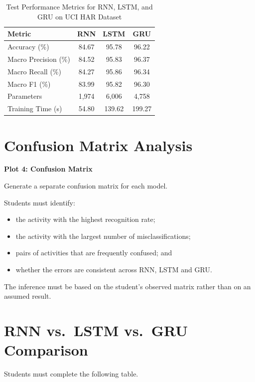 \documentclass[10pt]{article}
\begin{document}
\begin{table}[H]
\centering
\begin{tabular}{|l|c|c|c|}
\hline
Metric & RNN & LSTM & GRU\\
\hline
Accuracy (\%) & 84.67 & 95.78 & 96.22 \\
Macro Precision (\%) & 84.52 & 95.83 & 96.37\\
Macro Recall (\%) & 84.27 & 95.86 & 96.34\\
Macro F1 (\%) & 83.99 & 95.82 & 96.30 \\
Parameters & 1,974 & 6,006 & 4,758 \\
Training Time (s) & 54.80 & 139.62 & 199.27 \\
\hline
\end{tabular}
\caption{Test Performance Metrics for RNN, LSTM, and GRU on UCI HAR Dataset}
\label{tab:performance_eval}
\end{table}

\section{Confusion Matrix Analysis}

\textbf{Plot 4: Confusion Matrix}

Generate a separate confusion matrix for each model.

Students must identify:

\begin{itemize}
\item the activity with the highest recognition rate;
\item the activity with the largest number of misclassifications;
\item pairs of activities that are frequently confused; and
\item whether the errors are consistent across RNN, LSTM and GRU.
\end{itemize}

The inference must be based on the student's observed matrix rather than on
an assumed result.

\section{RNN vs.\ LSTM vs.\ GRU Comparison}

Students must complete the following table.
\end{document}
